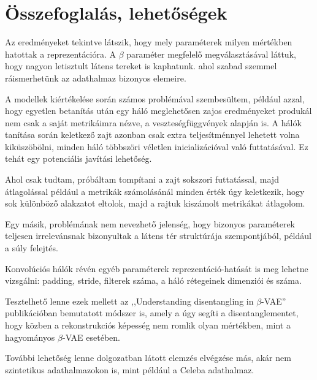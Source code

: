 \chapter{Összefoglalás, lehetőségek}

Az eredményeket tekintve látszik, hogy mely paraméterek milyen mértékben hatottak a reprezentációra. A $\beta$ paraméter megfelelő megválasztásával láttuk, hogy nagyon letisztult látens tereket is kaphatunk. ahol szabad szemmel ráismerhetünk az adathalmaz bizonyos elemeire.

A modellek kiértékelése során számos problémával szembesültem, például azzal, hogy egyetlen betanítás után egy háló meglehetősen zajos eredményeket produkál nem csak a saját metrikáimra nézve, a veszteségfüggvények alapján is. A hálók tanítása során keletkező zajt azonban csak extra teljesítménnyel lehetett volna kiküszöbölni, minden háló többszöri véletlen inicializációval való futtatásával. Ez tehát egy potenciális javítási lehetőség.

Ahol csak tudtam, próbáltam tompítani a zajt sokszori futtatással, majd átlagolással például a metrikák számolásánál minden érték úgy keletkezik, hogy sok különböző alakzatot eltolok, majd a rajtuk kiszámolt metrikákat átlagolom. 

Egy másik, problémának nem nevezhető jelenség, hogy bizonyos paraméterek teljesen irrelevánsnak bizonyultak a látens tér struktúrája szempontjából, például a súly felejtés.

Konvolúciós hálók révén egyéb paraméterek reprezentáció-hatását is meg lehetne vizsgálni: padding, stride, filterek száma, a háló rétegeinek dimenziói és száma.

Tesztelhető lenne ezek mellett az ,,Understanding disentangling in $\beta$-VAE'' \cite{bvae} publikációban bemutatott módszer is, amely a úgy segíti a disentanglementet, hogy közben a rekonstrukciós képesség nem romlik olyan mértékben, mint a hagyományos $\beta$-VAE esetében.

További lehetőség lenne dolgozatban látott elemzés elvégzése más, akár nem szintetikus adathalmazokon is, mint például a Celeba adathalmaz.




%
